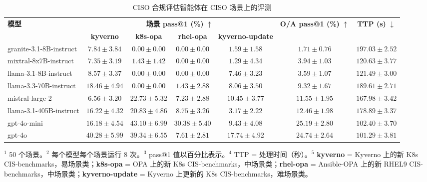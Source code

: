 \begin{table}[H]
\centering
\caption{CISO 合规评估智能体在 CISO 场景上的评测}
\label{tab:itb-ciso}
\begin{adjustbox}{max width=\linewidth}
\begin{tabular}{lcccc cc}
\toprule
\multirow{2}{*}{\textbf{模型}} & \multicolumn{4}{c}{\textbf{场景 pass@1 (\%)} $\uparrow$} & \multirow{2}{*}{\textbf{O/A pass@1 (\%)} $\uparrow$} & \multirow{2}{*}{\textbf{TTP (s)} $\downarrow$} \\
\cmidrule(lr){2-5}
 & \textbf{kyverno} & \textbf{k8s-opa} & \textbf{rhel-opa} & \textbf{kyverno-update} & & \\
\midrule
granite-3.1-8B-instruct & $7.84 \pm 3.84$ & $0.00 \pm 0.00$ & $0.00 \pm 0.00$ & $1.59 \pm 1.58$ & $1.71 \pm 0.76$ & $197.03 \pm 2.52$ \\
mixtral-8x7B-instruct & $7.35 \pm 3.19$ & $1.43 \pm 1.42$ & $0.00 \pm 0.00$ & $1.29 \pm 4.34$ & $3.94 \pm 1.03$ & $120.63 \pm 3.77$ \\
llama-3.1-8B-instruct & $8.57 \pm 3.37$ & $0.00 \pm 0.00$ & $0.00 \pm 0.00$ & $7.46 \pm 3.23$ & $3.59 \pm 1.07$ & $121.49 \pm 3.00$ \\
llama-3.3-70B-instruct & $18.46 \pm 4.94$ & $0.00 \pm 0.00$ & $1.43 \pm 2.88$ & $8.06 \pm 3.50$ & $9.32 \pm 1.67$ & $189.61 \pm 2.71$ \\
mistral-large-2 & $6.56 \pm 3.20$ & $22.73 \pm 5.32$ & $7.23 \pm 2.88$ & $10.45 \pm 3.77$ & $11.55 \pm 1.95$ & $167.98 \pm 3.42$ \\
llama-3.1-405B-instruct & $16.22 \pm 4.32$ & $20.83 \pm 4.86$ & $8.75 \pm 3.26$ & $3.17 \pm 2.22$ & $12.46 \pm 1.98$ & $178.89 \pm 3.37$ \\
gpt-4o-mini & $16.18 \pm 4.54$ & $\mathbf{43.10 \pm 6.99}$ & $\mathbf{30.38 \pm 5.40}$ & $9.43 \pm 4.08$ & $\mathbf{25.19 \pm 2.80}$ & $102.40 \pm 3.70$ \\
gpt-4o & $\mathbf{40.28 \pm 5.99}$ & $39.34 \pm 6.55$ & $7.61 \pm 2.81$ & $\mathbf{17.74 \pm 4.92}$ & $24.74 \pm 2.64$ & $\mathbf{101.29 \pm 3.81}$ \\
\bottomrule
\end{tabular}
\end{adjustbox}

{\footnotesize
\noindent $^1$ 50 个场景。\quad $^2$ 每个模型每个场景运行 8 次。\quad $^3$ pass@1 值以百分比表示。\quad $^4$ TTP = 处理时间（秒）。\quad $^5$ \textbf{kyverno} = Kyverno 上的新 K8s CIS-benchmarks，易场景类；\textbf{k8s-opa} = OPA 上的新 K8s CIS-benchmarks，中场景类；\textbf{rhel-opa} = Ansible-OPA 上的新 RHEL9 CIS-benchmarks，中场景类；\textbf{kyverno-update} = Kyverno 上更新的 K8s CIS-benchmarks，难场景类。
\par}
\end{table}

